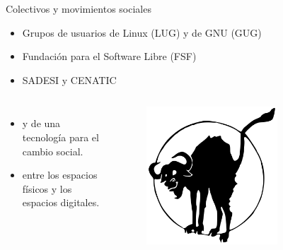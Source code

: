 \documentclass{beamer}
\begin{document}
\begin{frame}{Colectivos y movimientos sociales}
    \begin{itemize}
    	\item Grupos de usuarios de Linux (LUG) y de GNU (GUG)
      \item Fundación para el Software Libre (FSF)
      \item SADESI y CENATIC
    \end{itemize}

  \pause

  \begin{columns}
    \begin{itemize}
    \item {} y  de una tecnología para el cambio social.
    \item {} entre los espacios físicos y los espacios digitales.
    \end{itemize}
    \begin{figure}
      \centering
      \includegraphics[width=0.7\textwidth]{pics/blackgnu.png}
    \end{figure}
  \end{columns}
\end{frame}
\end{document}
